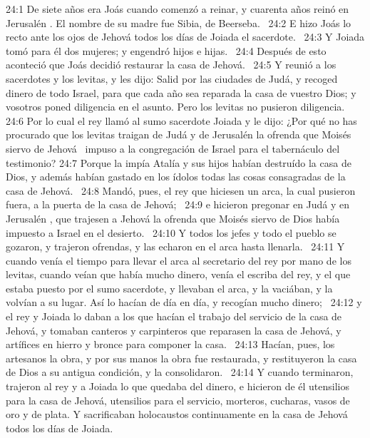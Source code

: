 																								
																								24:1 De siete años era Joás cuando comenzó a reinar, y cuarenta años reinó en Jerusalén . El nombre de su madre fue Sibia, de Beerseba.  
																								24:2 E hizo Joás lo recto ante los ojos de Jehová todos los días de Joiada el sacerdote.  
																								24:3 Y Joiada tomó para él dos mujeres; y engendró hijos e hijas.  
																								24:4 Después de esto aconteció que Joás decidió restaurar la casa de Jehová.  
																								24:5 Y reunió a los sacerdotes y los levitas, y les dijo: Salid por las ciudades de Judá, y recoged dinero de todo Israel, para que cada año sea reparada la casa de vuestro Dios; y vosotros poned diligencia en el asunto. Pero los levitas no pusieron diligencia.  
																								24:6 Por lo cual el rey llamó al sumo sacerdote Joiada y le dijo: ¿Por qué no has procurado que los levitas traigan de Judá y de Jerusalén la ofrenda que Moisés siervo de Jehová  impuso a la congregación de Israel para el tabernáculo del testimonio? 
																								24:7 Porque la impía Atalía y sus hijos habían destruído la casa de Dios, y además habían gastado en los ídolos todas las cosas consagradas de la casa de Jehová.  
																								24:8 Mandó, pues, el rey que hiciesen un arca, la cual pusieron fuera, a la puerta de la casa de Jehová;  
																								24:9 e hicieron pregonar en Judá y en Jerusalén , que trajesen a Jehová la ofrenda que Moisés siervo de Dios había impuesto a Israel en el desierto.  
																								24:10 Y todos los jefes y todo el pueblo se gozaron, y trajeron ofrendas, y las echaron en el arca hasta llenarla.  
																								24:11 Y cuando venía el tiempo para llevar el arca al secretario del rey por mano de los levitas, cuando veían que había mucho dinero, venía el escriba del rey, y el que estaba puesto por el sumo sacerdote, y llevaban el arca, y la vaciában, y la volvían a su lugar. Así lo hacían de día en día, y recogían mucho dinero;  
																								24:12 y el rey y Joiada lo daban a los que hacían el trabajo del servicio de la casa de Jehová, y tomaban canteros y carpinteros que reparasen la casa de Jehová, y artífices en hierro y bronce para componer la casa.  
																								24:13 Hacían, pues, los artesanos la obra, y por sus manos la obra fue restaurada, y restituyeron la casa de Dios a su antigua condición, y la consolidaron.  
																								24:14 Y cuando terminaron, trajeron al rey y a Joiada lo que quedaba del dinero, e hicieron de él utensilios para la casa de Jehová, utensilios para el servicio, morteros, cucharas, vasos de oro y de plata. Y sacrificaban holocaustos continuamente en la casa de Jehová todos los días de Joiada.  
